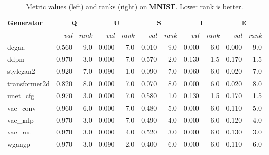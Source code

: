 \begin{table}[h]\centering\scriptsize
\caption{Metric values (left) and ranks (right) on \textbf{MNIST}. Lower rank is better.}
\label{tab:vals-ranks-mnist}
\begin{tabular}{l rr rr rr rr rr}
\toprule
\multirow{2}{*}{\textbf{Generator}} & \multicolumn{2}{c}{\textbf{Q}} & \multicolumn{2}{c}{\textbf{U}} & \multicolumn{2}{c}{\textbf{S}} & \multicolumn{2}{c}{\textbf{I}} & \multicolumn{2}{c}{\textbf{E}} \\
 & \textit{val} & \textit{rank} & \textit{val} & \textit{rank} & \textit{val} & \textit{rank} & \textit{val} & \textit{rank} & \textit{val} & \textit{rank} \\
\midrule
dcgan         & 0.560 & 9.0 & 0.000 & 7.0 & 0.010 & 9.0 & 0.000 & 6.0 & 0.000 & 9.0 \\
ddpm          & 0.970 & 3.0 & 0.000 & 7.0 & 0.570 & 2.0 & 0.130 & 1.5 & 0.170 & 1.5 \\
stylegan2     & 0.920 & 7.0 & 0.090 & 1.0 & 0.090 & 7.0 & 0.060 & 6.0 & 0.020 & 7.0 \\
transformer2d & 0.820 & 8.0 & 0.000 & 7.0 & 0.070 & 8.0 & 0.000 & 6.0 & 0.020 & 8.0 \\
unet\_cfg     & 0.970 & 3.0 & 0.000 & 7.0 & 0.580 & 1.0 & 0.130 & 1.5 & 0.170 & 1.5 \\
vae\_conv     & 0.960 & 6.0 & 0.000 & 7.0 & 0.480 & 5.0 & 0.000 & 6.0 & 0.110 & 5.0 \\
vae\_mlp      & 0.970 & 3.0 & 0.000 & 7.0 & 0.490 & 4.0 & 0.000 & 6.0 & 0.120 & 4.0 \\
vae\_res      & 0.970 & 3.0 & 0.000 & 4.0 & 0.520 & 3.0 & 0.000 & 6.0 & 0.130 & 3.0 \\
wgangp        & 0.970 & 3.0 & 0.090 & 2.0 & 0.400 & 6.0 & 0.000 & 6.0 & 0.110 & 6.0 \\
\bottomrule
\end{tabular}
\end{table}

